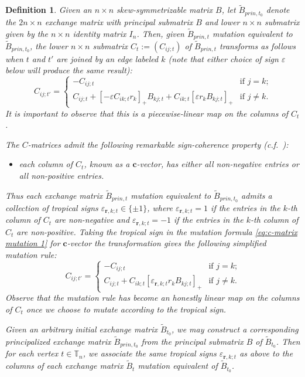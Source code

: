 \documentclass{amsart}
\newtheorem{definition}[theorem]{Definition}
\numberwithin{equation}{section}
\newcommand{\bfc}{\mathbf{c}}
\newcommand{\bfr}{{\boldsymbol{r}}}
\newcommand{\TT}{\mathbb{T}}
\begin{document}
\begin{definition}
  \label{def:tropical signs}
  Given an $n\times n$ skew-symmetrizable matrix $B$, let $\tilde B_{prin,t_0}$ denote the $2n\times n$ exchange matrix with principal submatrix $B$ and lower $n\times n$ submatrix given by the $n\times n$ identity matrix $I_n$.
  Then, given $\tilde B_{prin,t}$ mutation equivalent to $\tilde B_{prin,t_0}$, the lower $n\times n$ submatrix $C_t:=(C_{ij;t})$ of $\tilde B_{prin,t}$ transforms as follows when $t$ and $t'$ are joined by an edge labeled $k$ (note that either choice of sign $\varepsilon$ below will produce the same result):
  \begin{equation}
    \label{eq:c-matrix mutation 1}
    C_{ij;t'}=
    \begin{cases}
      -C_{ij;t} & \text{if $j=k$;}\\
      C_{ij;t}+[-\varepsilon C_{ik;t} r_k]_+B_{kj;t}+C_{ik;t}[\varepsilon r_kB_{kj;t}]_+ & \text{if $j\ne k$.}
    \end{cases}
  \end{equation}
  It is important to observe that this is a piecewise-linear map on the columns of $C_t$.

  The $C$-matrices admit the following remarkable \emph{sign-coherence} property (c.f.\ \cite{FZ07,NZ12,GHKK14,NR16}): 
  \begin{itemize}
    \item each column of $C_t$, known as a \emph{$\bfc$-vector}, has either all non-negative entries or all non-positive entries.
  \end{itemize}
  Thus each exchange matrix $\tilde B_{prin,t}$ mutation equivalent to $\tilde B_{prin,t_0}$ admits a collection of \emph{tropical signs} $\varepsilon_{\bfr,k;t}\in\{\pm1\}$, where $\varepsilon_{\bfr,k;t}=1$ if the entries in the $k$-th column of $C_t$ are non-negative and $\varepsilon_{\bfr,k;t}=-1$ if the entries in the $k$-th column of $C_t$ are non-positive. 
  Taking the tropical sign in the mutation formula \eqref{eq:c-matrix mutation 1} for $\bfc$-vector the transformation gives the following simplified mutation rule:
  \begin{equation}
    \label{eq:c-matrix mutation 2}
    C_{ij;t'}=
    \begin{cases}
      -C_{ij;t} & \text{if $j=k$;}\\
      C_{ij;t}+C_{ik;t}[\varepsilon_{\bfr,k;t} r_kB_{kj;t}]_+ & \text{if $j\ne k$.}
    \end{cases}
  \end{equation}
  Observe that the mutation rule has become an honestly linear map on the columns of $C_t$ once we choose to mutate according to the tropical sign.

  Given an arbitrary initial exchange matrix $\tilde B_{t_0}$, we may construct a corresponding principalized exchange matrix $\tilde B_{prin,t_0}$ from the principal submatrix $B$ of $\tilde B_{t_0}$.
  Then for each vertex $t\in\TT_n$, we associate the same tropical signs $\varepsilon_{\bfr,k;t}$ as above to the columns of each exchange matrix $\tilde B_t$ mutation equivalent of $\tilde B_{t_0}$.
\end{definition}
\end{document}
